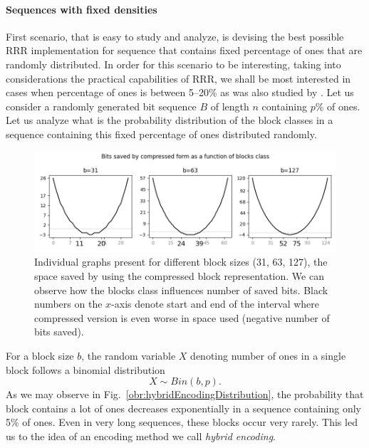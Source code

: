 \paragraph{Sequences with fixed densities}

First scenario, that is easy to study and analyze, is devising the best possible RRR
implementation for sequence that contains fixed percentage of ones that are randomly
distributed. In order for this scenario to be interesting, taking into considerations
the practical capabilities of RRR, we shall be most interested in cases when percentage 
of ones is between 5--20\% as was also studied by \cite{navarro2012fast}. Let us consider
a randomly generated bit sequence $B$ of length $n$ containing $p\%$ of ones. Let us
analyze what is the probability distribution of the block classes in a sequence containing
this fixed percentage of ones distributed randomly.
\begin{figure}
	\centerline{
		\includegraphics[width=\textwidth]{images/rrr_space_savings}
	}
	\caption[TODO]{Individual graphs present for different block sizes (31, 63, 127), 
    the space saved by using the compressed block representation. We can observe how
    the blocks class influences number of saved bits. Black numbers on the $x$-axis
    denote start and end of the interval where compressed version is even worse
    in space used (negative number of bits saved).
	}
	\label{obr:rrrSpaceSavings}
\end{figure}

For a block size $b$, the random variable $X$ denoting number of ones in a single
block follows a binomial distribution $$X \sim Bin(b, p).$$ As we may observe in
Fig.~\ref{obr:hybridEncodingDistribution}, the probability that block contains
a lot of ones decreases exponentially in a sequence containing only 5\% of ones.
Even in very long sequences, these blocks occur very rarely. This led us to the
idea of an encoding method we call \textit{hybrid encoding}.

